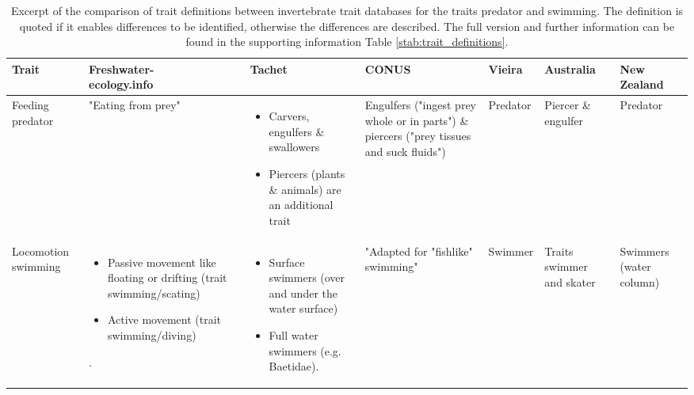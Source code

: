 \documentclass[12pt]{article}
\makeatletter
\newcommand{\specialcell}[2][c]{%
  \begin{tabular}[#1]{@{}c@{}}#2\end{tabular}}
\makeatother
\begin{document}
\begin{landscape}
  \begin{longtable}{m{2.0cm}|m{4.0cm}|m{4.2cm}|m{4.2cm}|m{1.7cm}|m{2cm}|m{2.2cm}}
      \caption{Excerpt of the comparison of trait definitions between invertebrate trait databases for the traits predator and swimming. The definition is quoted if it enables differences to be identified, otherwise the differences are described. The full version and further information can be found in the supporting information Table \ref{stab:trait_definitions}.}
      \label{tab:trait_definitions}
      \endfirsthead
      \toprule[.1em]
      Trait & \specialcell{Freshwater- \\ ecology.info} & Tachet & CONUS & Vieira & Australia & \specialcell{New \\ Zealand} \\
      \toprule[.1em]
      Feeding predator & 
        "Eating from prey" & 
        \begin{itemize}
            \item Carvers, engulfers \& swallowers
            \item Piercers (plants \& animals) are an additional trait
        \end{itemize} & %
        Engulfers ("ingest prey whole or in parts") \& 
        piercers ("prey tissues and suck fluids") & 
        Predator &
        Piercer \& engulfer &
        Predator
        \\ 
        \midrule
        Locomotion swimming & 
        \begin{itemize}
            \item Passive movement like floating or drifting (trait swimming/scating)
            \item Active movement (trait swimming/diving)
        \end{itemize}. &
        \begin{itemize}
            \item Surface swimmers (over and under the water surface)
            \item Full water swimmers (e.g. Baetidae).
        \end{itemize} & 
        "Adapted for "fishlike" swimming" & 
        Swimmer & 
        Traits swimmer and skater & 
        Swimmers (water column)
        \\
      \bottomrule
  \end{longtable}
\end{landscape}
\end{document}
